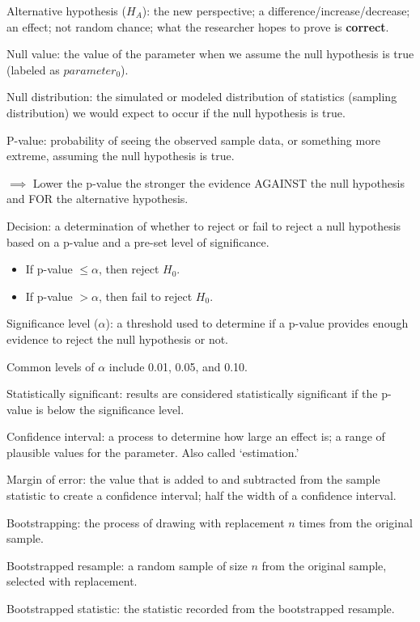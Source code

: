\documentclass[
]{report}
\newcommand{\rgi}{\hspace{24pt}}  %
\begin{document}
Alternative hypothesis (\(H_A\)): the new perspective; a difference/increase/decrease; an effect; not random chance; what the researcher hopes to prove is \textbf{correct}.

Null value: the value of the parameter when we assume the null hypothesis is true (labeled as \(parameter_0\)).

Null distribution: the simulated or modeled distribution of statistics (sampling distribution) we would expect to occur if the null hypothesis is true.

P-value: probability of seeing the observed sample data, or something more extreme, assuming the null hypothesis is true.

\(\implies\) Lower the p-value the stronger the evidence AGAINST the null hypothesis and FOR the alternative hypothesis.

Decision: a determination of whether to reject or fail to reject a null hypothesis based on a p-value and a pre-set level of significance.

\begin{itemize}
\item
  If p-value \(\leq \alpha\), then reject \(H_0\).
\item
  If p-value \(> \alpha\), then fail to reject \(H_0\).
\end{itemize}

Significance level (\(\alpha\)): a threshold used to determine if a p-value provides enough evidence to reject the null hypothesis or not.

\rgi Common levels of \(\alpha\) include 0.01, 0.05, and 0.10.

Statistically significant: results are considered statistically significant if the p-value is below the significance level.

Confidence interval: a process to determine how large an effect is; a range of plausible values for the parameter. Also called `estimation.'

Margin of error: the value that is added to and subtracted from the sample statistic to create a confidence interval; half the width of a confidence interval.

Bootstrapping: the process of drawing with replacement \(n\) times from the original sample.

Bootstrapped resample: a random sample of size \(n\) from the original sample, selected with replacement.

Bootstrapped statistic: the statistic recorded from the bootstrapped resample.
\end{document}
